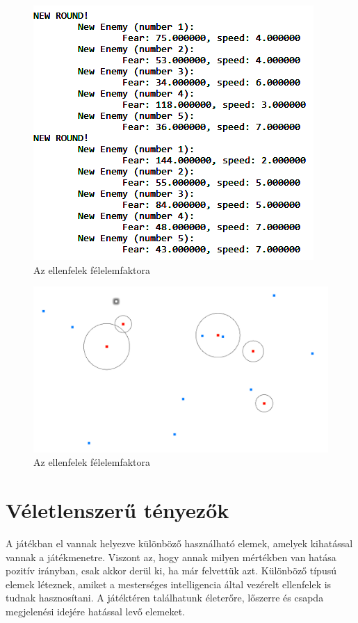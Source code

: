 \begin{figure}[h]
\centering
\includegraphics[scale=0.8]{kepek/anim_random_values.png}
\caption{Az ellenfelek félelemfaktora}
\label{fig:behavior_settings}
\end{figure}

\begin{figure}[h]
\centering
\includegraphics[scale=0.42]{kepek/behavior_demo.png}
\caption{Az ellenfelek félelemfaktora}
\label{fig:behavior_demo}
\end{figure}

\section{Véletlenszerű tényezők}

A játékban el vannak helyezve különböző használható elemek, amelyek kihatással vannak a játékmenetre. Viszont az, hogy annak milyen mértékben van hatása pozitív irányban, csak akkor derül ki, ha már felvettük azt. Különböző típusú elemek léteznek, amiket a mesterséges intelligencia által vezérelt ellenfelek is tudnak hasznosítani. A játéktéren találhatunk életerőre, lőszerre és csapda megjelenési idejére hatással levő elemeket.


